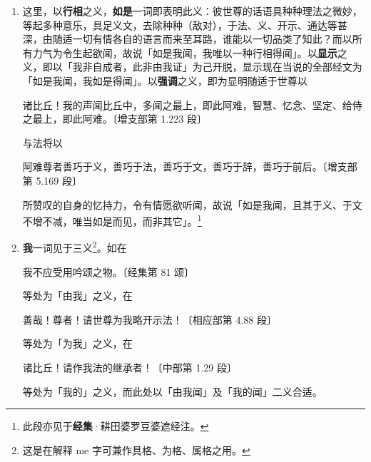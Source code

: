 \begin{enumerate}
\item 这里，以\textbf{行相}之义，\textbf{如是}一词即表明此义：彼世尊的话语具种种理法之微妙，等起多种意乐，具足义文，去除种种（敌对），于法、义、开示、通达等甚深，由随适一切有情各自的语言而来至耳路，谁能以一切品类了知此？而以所有力气为令生起欲闻，故说「如是我闻，我唯以一种行相得闻」。以\textbf{显示}之义，即以「我非自成者，此非由我证」为己开脱，显示现在当说的全部经文为「如是我闻，我如是得闻」。以\textbf{强调}之义，即为显明随适于世尊以\begin{quoting}诸比丘！我的声闻比丘中，多闻之最上，即此阿难，智慧、忆念、坚定、给侍之最上，即此阿难。{\bluefootnotesize 〔增支部第 1.223 段〕}\end{quoting}与法将以\begin{quoting}阿难尊者善巧于义，善巧于法，善巧于文，善巧于辞，善巧于前后。{\bluefootnotesize 〔增支部第 5.169 段〕}\end{quoting}所赞叹的自身的忆持力，令有情愿欲听闻，故说「如是我闻，且其于义、于文不增不减，唯当如是而见，而非其它」。\footnote{此段亦见于\textbf{经集}·耕田婆罗豆婆遮经注。}
\item \textbf{我}一词见于三义\footnote{这是在解释 me 字可兼作具格、为格、属格之用。}。如在\begin{quoting}我不应受用吟颂之物。{\bluefootnotesize 〔经集第 81 颂〕}\end{quoting}等处为「由我」之义，在\begin{quoting}善哉！尊者！请世尊为我略开示法！{\bluefootnotesize 〔相应部第 4.88 段〕}\end{quoting}等处为「为我」之义，在\begin{quoting}诸比丘！请作我法的继承者！{\bluefootnotesize 〔中部第 1.29 段〕}\end{quoting}等处为「我的」之义，而此处以「由我闻」及「我的闻」二义合适。

\end{enumerate}
